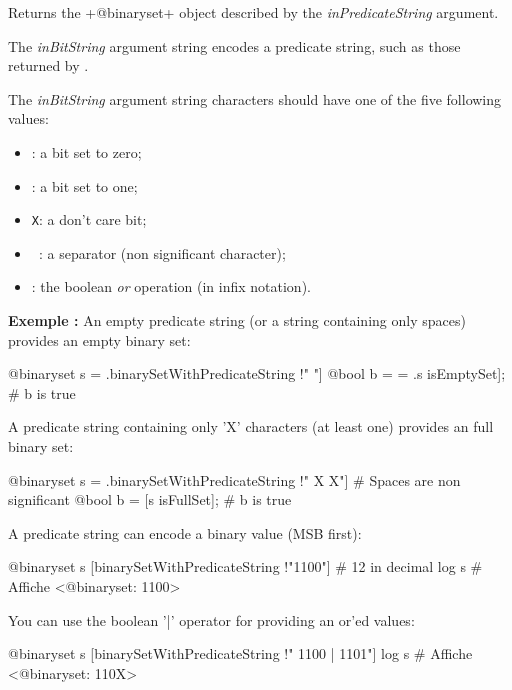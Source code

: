 Returns the \ggs+@binaryset+ object described by the \emph{inPredicateString} argument.

The \emph{inBitString} argument string encodes a predicate string, such as those returned by .

\begin{description}
\item The \emph{inBitString} argument string characters should have one of the five following values:
\begin{itemize}
\item \texttt{\textquotesingle}: a bit set to zero;
\item \texttt{\textquotesingle}: a bit set to one;
\item \texttt{\textquotesingle X\textquotesingle}: a don't care bit;
\item \texttt{\textquotesingle~\textquotesingle}: a separator (non significant character);
\item \texttt{\textquotesingle\textbar\textquotesingle}: the boolean \emph{or} operation (in infix notation).
\end{itemize}
\end{description}


\textbf{Exemple :}
An empty predicate string (or a string containing only spaces) provides an empty binary set:
\begin{galgas}
@binaryset s = .binarySetWithPredicateString !" "]
@bool b = = .s isEmptySet]; # b is true
\end{galgas}


A predicate string containing only 'X' characters (at least one) provides an full binary set:
\begin{galgas}
@binaryset s = .binarySetWithPredicateString !" X X"] # Spaces are non significant
@bool b = [s isFullSet]; # b is true
\end{galgas}


A predicate string can encode a binary value (MSB first):
\begin{galgas}
@binaryset s [binarySetWithPredicateString !"1100"] # 12 in decimal
log s # Affiche <@binaryset: 1100>
\end{galgas}


You can use the boolean '|' operator for providing an or'ed values:
\begin{galgas}
@binaryset s [binarySetWithPredicateString !" 1100 | 1101"]
log s # Affiche <@binaryset: 110X>
\end{galgas}



